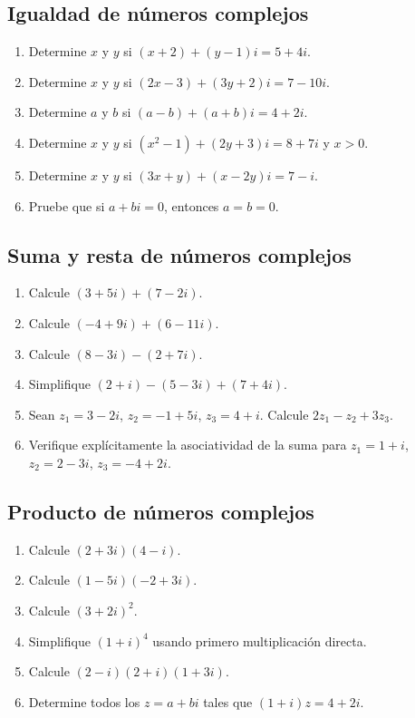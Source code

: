 \subsection{Igualdad de números complejos}
\begin{enumerate}
\item Determine $x$ y $y$ si $(x+2)+(y-1)i=5+4i$.
\item Determine $x$ y $y$ si $(2x-3)+(3y+2)i=7-10i$.
\item Determine $a$ y $b$ si $(a-b)+(a+b)i=4+2i$.
\item Determine $x$ y $y$ si $(x^2-1)+(2y+3)i=8+7i$ y $x>0$.
\item Determine $x$ y $y$ si $(3x+y)+(x-2y)i=7-i$.
\item Pruebe que si $a+bi=0$, entonces $a=b=0$.
\end{enumerate}

\subsection{Suma y resta de números complejos}
\begin{enumerate}
\item Calcule $(3+5i)+(7-2i)$.
\item Calcule $(-4+9i)+(6-11i)$.
\item Calcule $(8-3i)-(2+7i)$.
\item Simplifique $(2+i)-(5-3i)+(7+4i)$.
\item Sean $z_1=3-2i$, $z_2=-1+5i$, $z_3=4+i$. Calcule $2z_1-z_2+3z_3$.
\item Verifique explícitamente la asociatividad de la suma para $z_1=1+i$, $z_2=2-3i$, $z_3=-4+2i$.
\end{enumerate}

\subsection{Producto de números complejos}
\begin{enumerate}
\item Calcule $(2+3i)(4-i)$.
\item Calcule $(1-5i)(-2+3i)$.
\item Calcule $(3+2i)^2$.
\item Simplifique $(1+i)^4$ usando primero multiplicación directa.
\item Calcule $(2-i)(2+i)(1+3i)$.
\item Determine todos los $z=a+bi$ tales que $(1+i)z=4+2i$.
\end{enumerate}

